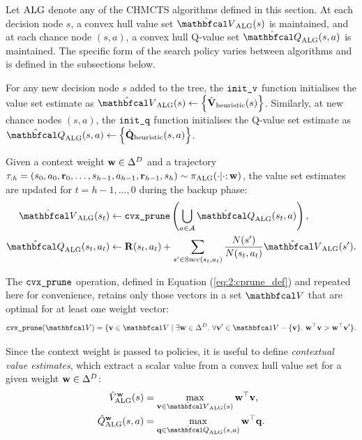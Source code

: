     Let ${\textnormal{ALG}}$ denote any of the CHMCTS algorithms defined in this section. At each decision node $s$, a convex hull value set $\Valg(s)$ is maintained, and at each chance node $(s,a)$, a convex hull Q-value set $\Qalg(s,a)$ is maintained. The specific form of the search policy varies between algorithms and is defined in the subsections below.

    For any new decision node $s$ added to the tree, the ${\textnormal{\texttt{init\_v}}}$ function initialises the value set estimate as $\Valg(s)\leftarrow \left\{\Vinitbff(s)\right\}$. Similarly, at new chance nodes $(s,a)$, the ${\textnormal{\texttt{init\_q}}}$ function initialises the Q-value set estimate as $\Qalg(s,a)\leftarrow \left\{\Qinitbff(s,a)\right\}$.

    Given a context weight $\mathbf{w}\in\Delta^D$ and a trajectory $\splitatcommas{\tau_{:h}=(s_0,a_0,\bff{r}_0,\ldots,s_{h-1},a_{h-1},\bff{r}_{h-1},s_h)\sim\pialg(\cdot|\cdot;\bff{w})}$, the value set estimates are updated for $t=h-1,\ldots,0$ during the backup phase:
    \begin{align}
        \Valg(s_t) &\leftarrow \cprune \left( 
            \bigcup_{a\in\cl{A}} \Qalg(s_t,a) \right), 
            \label{eq:5:chmcts_v_backup} \\
        \Qalg(s_t,a_t) &\leftarrow \bff{R}(s_t,a_t) + 
            \sum_{s'\in\suc{s_t}{a_t}} 
            \frac{N(s')}{N(s_t,a_t)}\Valg(s'). 
            \label{eq:5:chmcts_q_backup}
    \end{align}

    The ${\textnormal{\texttt{cvx\_prune}}}$ operation, defined in Equation 
    (\ref{eq:2:cprune_def}) and repeated here for convenience, retains only those vectors in a set $\bfcl{V}$ that are optimal for at least one weight vector:
    \begin{align}
        \cprune(\bfcl{V}) = \{\bff{v}\in\bfcl{V} \mid 
            \exists \bff{w}\in\Delta^D.\ 
            \forall \bff{v}'\in\bfcl{V}-\{\bff{v}\}.\ 
            \bff{w}^\top \bff{v} > \bff{w}^\top \bff{v}' \}. 
            \label{eq:5:cprune_def}
    \end{align}

    Since the context weight is passed to policies, it is useful to define \textit{contextual value estimates}, which extract a scalar value from a convex hull value set for a given weight $\mathbf{w}\in\Delta^D$:
    \begin{align}
        \Valgctx{\bff{w}}(s) &= \max_{\bff{v}\in\Valg(s)} 
            \bff{w}^\top \bff{v}, 
            \label{eq:5:contextual_value} \\
        \Qalgctx{\bff{w}}(s,a) &= \max_{\bff{q}\in\Qalg(s,a)} 
            \bff{w}^\top \bff{q}. 
            \label{eq:5:contextual_qvalue}
    \end{align}

